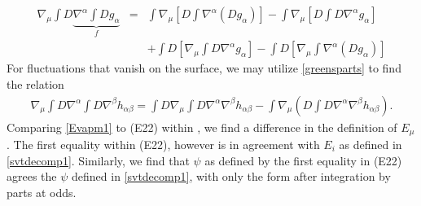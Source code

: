 \documentclass[10pt,letterpaper]{article}
\numberwithin{equation}{section}
\begin{document}
\begin{appendices}
\begin{eqnarray}
\nonumber\\
\nabla_\mu\int D\underbrace{\nabla^\alpha\int D g_\alpha}_{f} &=& \int\nabla_\mu\left[ D\int \nabla^\alpha (D g_\alpha)\right]
-\int \nabla_\mu \left[ D\int D \nabla^\alpha g_\alpha\right]
\nonumber\\
&& + \int D\left[ \nabla_\mu \int D \nabla^\alpha g_\alpha\right] - \int D\left[ \nabla_\mu \int 
\nabla^\alpha(Dg_\alpha)\right]
\label{greensparts}
\end{eqnarray}
For fluctuations that vanish on the surface, we may utilize \eqref{greensparts} to find the relation
\begin{eqnarray}
\nabla_\mu \int D \nabla^\alpha \int D \nabla^\beta h_{\alpha\beta}=\int D\nabla_\mu \int D\nabla^\alpha\nabla^\beta h_{\alpha\beta}
- \int \nabla_\mu \left(D\int D \nabla^\alpha\nabla^\beta h_{\alpha\beta}\right).
\label{Evapm1}
\end{eqnarray}	
Comparing \eqref{Evapm1} to (E22) within \cite{APM}, we find a difference in the definition of $E_\mu$. The first equality within (E22), however is in agreement with $E_i$ as defined in \eqref{svtdecomp1}. Similarly, we find that $\psi$ as defined by the first equality in (E22) agrees the $\psi$ defined in \eqref{svtdecomp1}, with only the form after integration by parts at odds. 
%
%
%

\end{appendices}
\end{document}
